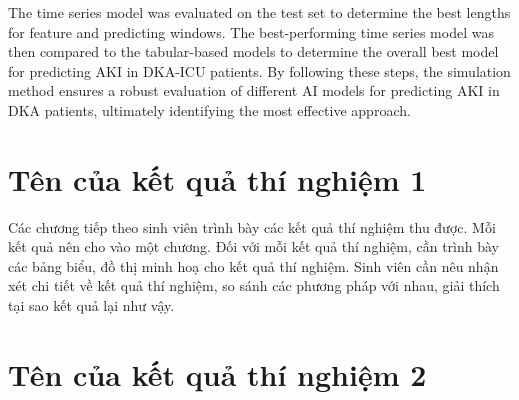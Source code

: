 \documentclass[../main.tex]{subfiles}
\begin{document}
The time series model was evaluated on the test set to determine the best lengths for feature and predicting windows. 
The best-performing time series model was then compared to the tabular-based models to determine the overall best model for predicting AKI in DKA-ICU patients. 
By following these steps, the simulation method ensures a robust evaluation of different AI models for predicting AKI in DKA patients, ultimately identifying the most effective approach.



\section{Tên của kết quả thí nghiệm 1}

Các chương tiếp theo sinh viên trình bày các kết quả thí nghiệm thu được. Mỗi kết quả nên cho vào một chương. Đối với mỗi kết quả thí nghiệm, cần trình bày các bảng biểu, đồ thị minh hoạ cho kết quả thí nghiệm. Sinh viên cần nêu nhận xét chi tiết về kết quả thí nghiệm, so sánh các phương pháp với nhau, giải thích tại sao kết quả lại như vậy.

\section{Tên của kết quả thí nghiệm 2}
\end{document}
